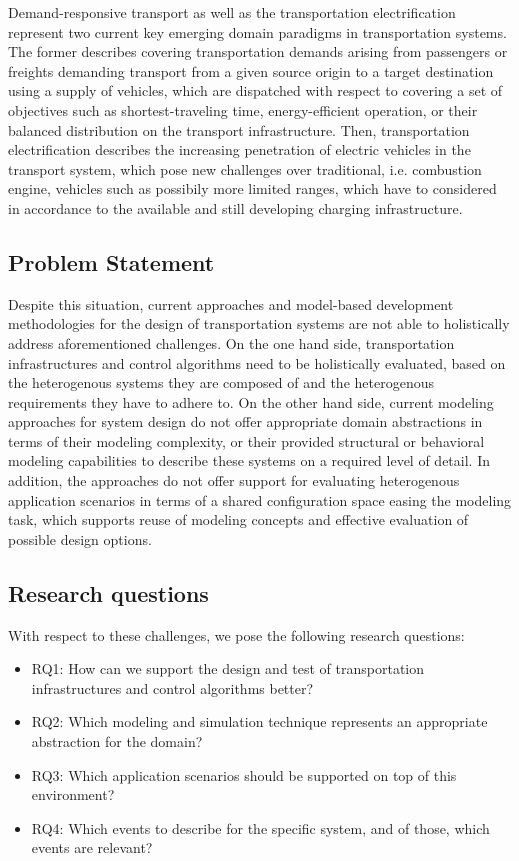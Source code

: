 \documentclass[graybox]{svmult}
\begin{document}
Demand-responsive transport \cite{brake_demand_2004} as well as the transportation electrification \cite{pereirinha2018main} represent two current key emerging domain paradigms in transportation systems. The former describes covering transportation demands arising from passengers or freights demanding transport from a given source origin to a target destination using a supply of vehicles, which are dispatched with respect to covering a set of objectives such as shortest-traveling time, energy-efficient operation, or their balanced distribution on the transport infrastructure. Then, transportation electrification describes the increasing penetration of electric vehicles in the transport system, which pose new challenges over traditional, i.e. combustion engine, vehicles such as possibily more limited ranges, which have to considered in accordance to the available and still developing charging infrastructure. 

\subsection{Problem Statement}

Despite this situation, current approaches and model-based development methodologies for the design of transportation systems are not able to holistically address aforementioned challenges. On the one hand side, transportation infrastructures and control algorithms need to be holistically evaluated, based on the heterogenous systems they are composed of and the heterogenous requirements they have to adhere to. On the other hand side, current modeling approaches for system design do not offer appropriate domain abstractions in terms of their modeling complexity, or their provided structural or behavioral modeling capabilities to describe these systems on a required level of detail. In addition, the approaches do not offer support for evaluating heterogenous application scenarios in terms of a shared configuration space easing the modeling task, which supports reuse of modeling concepts and effective evaluation of possible design options. 

\subsection{Research questions}
With respect to these challenges, we pose the following research questions:
\begin{itemize}
	\item RQ1: How can we support the design and test of transportation infrastructures and control algorithms better?
	\item RQ2: Which modeling and simulation technique represents an appropriate abstraction for the domain?
	\item RQ3: Which application scenarios should be supported on top of this environment?
	\item RQ4: Which events to describe for the specific system, and of those, which events are relevant?
\end{itemize}
\end{document}
